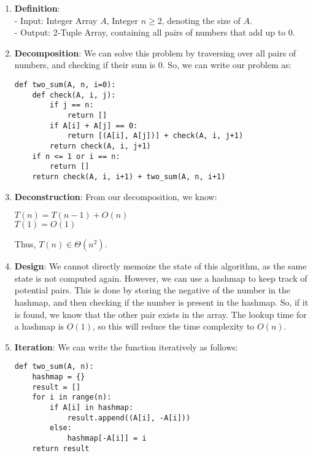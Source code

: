 \documentclass[a4paper]{article}
\begin{document}
\begin{enumerate}[label=\roman*]   
    \item \textbf{Definition}:\\
    - Input: Integer Array $A$, Integer $n \geq 2$, denoting the size of $A$.\\
    - Output: 2-Tuple Array, containing all pairs of numbers that add up to $0$.
    
    \item \textbf{Decomposition}: We can solve this problem by traversing over all pairs of numbers, and checking if their sum is 0. So, we can write our problem as:
\begin{verbatim}
def two_sum(A, n, i=0):
    def check(A, i, j):
        if j == n:
            return []
        if A[i] + A[j] == 0:
            return [(A[i], A[j])] + check(A, i, j+1)
        return check(A, i, j+1)
    if n <= 1 or i == n:
        return []
    return check(A, i, i+1) + two_sum(A, n, i+1)
\end{verbatim}

\item \textbf{Deconstruction}: From our decomposition, we know:
\begin{center}
    $T(n) = T(n-1) + O(n)$\\
    $T(1) = O(1)$
\end{center}


Thus, $T(n) \in \Theta(n^2)$.

\item \textbf{Design}: We cannot directly memoize the state of this algorithm, as the same state is not computed again. However, we can use a hashmap to keep track of potential pairs. This is done by storing the negative of the number in the hashmap, and then checking if the number is present in the hashmap. So, if it is found, we know that the other pair exists in the array. The lookup time for a hashmap is $O(1)$, so this will reduce the time complexity to $O(n)$.

\item \textbf{Iteration}: We can write the function iteratively as follows:

\begin{verbatim}
def two_sum(A, n):
    hashmap = {}
    result = []
    for i in range(n):
        if A[i] in hashmap:
            result.append((A[i], -A[i]))
        else:
            hashmap[-A[i]] = i
    return result
\end{verbatim}

\end{enumerate}
\end{document}
